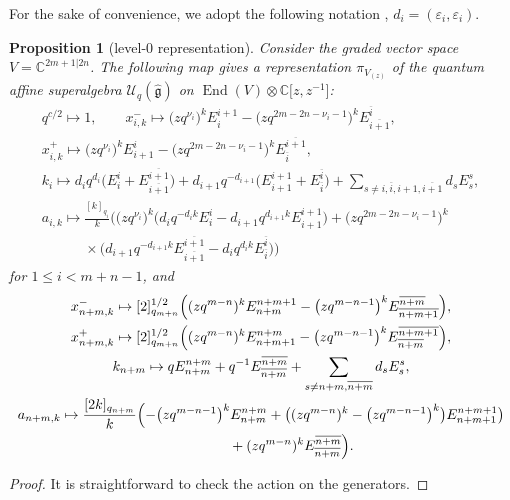 \documentclass[10pt,a4paper]{amsart}
\numberwithin{equation}{section}
\newtheorem{Proposition}[Theorem]{Proposition}
 { \theoremstyle{definition}
\newtheorem{Definition}[Theorem]{Definition}
\newtheorem{Note}[Theorem]{Note}
\newtheorem{Example}[Theorem]{Example}
\newtheorem{Remark}[Theorem]{Remark} }
\begin{document}
For the sake of convenience, we adopt the following notation
, $ d_i=(\varepsilon_i,\varepsilon_i)$.
\begin{Proposition}[level-0 representation]\label{Level-0}
 Consider the graded vector space $V=\mathbb{C}^{2m+1|2n}$. The following map gives a representation $\pi_{V_{(z)}}$ of the quantum affine superalgebra $\mathcal{U}_q(\mathfrak{\hat{g}})$ on ${\operatorname{End}(V)\otimes\mathbb{C}\bigl[z, z^{-1}\bigr]}$:
\begin{gather*}
q^{c/2}\mapsto1,\qquad
 x_{i,k}^{-}\mapsto \bigl(zq^{\nu_i}\bigr)^kE^{i+1}_i-\bigl(zq^{2m-2n-\nu_i-1}\bigr)^kE^{\overline{i}}_{\overline{i+1}},\\
 x_{i,k}^{+}\mapsto \bigl(zq^{\nu_i}\bigr)^kE^{i}_{i+1}-\bigl(zq^{2m-2n-\nu_i-1}\bigr)^kE^{\overline{i+1}}_{\overline{i}},\\
 k_i\mapsto d_iq^{d_{i}}\bigl(E^{i}_{i}+E^{\overline{i+1}}_{\overline{i+1}}\bigr)+d_{i+1}q^{-d_{i+1}}\bigl(E^{i+1}_{i+1}+E^{\overline{i}}_{\overline{i}}\bigr)
 +\sum\limits_{s\neq i,\overline{i},i+1,\overline{i+1}}d_sE^{s}_{s},\\
 a_{i,k}\mapsto \frac{[k]_{q_i}}{k}\bigl( \bigl(zq^{\nu_i}\bigr)^k\bigl(d_iq^{-d_ik}E^{i}_{i}-d_{i+1}q^{d_{i+1}k}E^{i+1}_{i+1}\bigr)+
 \bigl(zq^{2m-2n-\nu_i-1}\bigr)^k\\
\phantom{ a_{i,k}\mapsto}{} \times\bigl(d_{i+1}q^{-d_{i+1}k}E^{\overline{i+1}}_{\overline{i+1}}-d_{i}q^{d_{i}k}E^{\overline{i}}_{\overline{i}}\bigr)\bigr)
\end{gather*}
for $1\leq i< m+n-1$, and
\begin{gather*}
 x_{n+m,k}^{-}\mapsto [2]_{q_{m+n}}^{1/2}\Bigl( (zq^{m-n})^kE^{n+m+1}_{n+m}-\bigl(zq^{m-n-1}\bigr)^kE^{\overline{n+m}}_{\overline{n+m+1}}\Bigr), \\
 x_{n+m,k}^{+}\mapsto [2]_{q_{m+n}}^{1/2}\Bigl( (zq^{m-n})^kE^{n+m}_{n+m+1}-\bigl(zq^{m-n-1}\bigr)^kE^{\overline{n+m+1}}_{\overline{n+m}}\Bigr), \\
 k_{n+m}\mapsto qE^{n+m}_{n+m}+q^{-1}E^{\overline{n+m}}_{\overline{n+m}}
 +\sum\limits_{s\neq n+m,\overline{n+m}}d_sE^{s}_{s},\\
 a_{n+m,k}\mapsto \frac{[2k]_{q_{n+m}}}{k}\Bigl( -\bigl(zq^{m-n-1}\bigr)^kE^{n+m}_{n+m}+\bigl((zq^{m-n})^k-\bigl(zq^{m-n-1}\bigr)^k\bigr)E^{n+m+1}_{n+m+1}\bigr)\\
 \phantom{ a_{n+m,k}\mapsto}{}+
 (zq^{m-n})^kE^{\overline{n+m}}_{\overline{n+m}}\Bigr).
\end{gather*}
\end{Proposition}
\begin{proof}
It is straightforward to check the action on the generators.
\end{proof}
\end{document}
